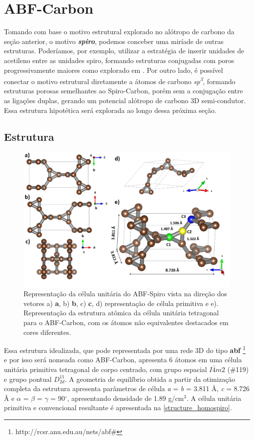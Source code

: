 \section{ABF-Carbon}
		
		Tomando com base o motivo estrutural explorado no alótropo de carbono da seção anterior, o motivo \textbf{\textit{spiro}}, podemos conceber uma miríade de outras estruturas. Poderíamos, por exemplo, utilizar a estratégia de inserir unidades de acetileno entre as unidades spiro, formando estruturas conjugadas com poros progressivamente maiores como explorado em \cite{costa2018n}. Por outro lado, é possível conectar o motivo estrutural diretamente a átomos de carbono \textit{sp\textsuperscript{3}}, formando estruturas porosas semelhantes ao Spiro-Carbon, porém sem a conjugação entre as ligações duplas, gerando um potencial alótropo de carbono 3D semi-condutor. Essa estrutura hipotética será explorada ao longo dessa próxima seção.
	
	\subsection{Estrutura}
	
				
		\begin{figure}[ht!]
			\centering
			\includegraphics[width=.9\linewidth]{capitulos/fig/results2/structure}
			\caption{Representação da célula unitária do ABF-Spiro vista na direção dos vetores a) \textbf{a}, b) \textbf{b}, c) \textbf{c}, d) representação de célula primitiva e e). Representação da estrutura atômica da célula unitária tetragonal para o ABF-Carbon, com os átomos não equivalentes destacados em cores diferentes.}
			\label{structure_homospiro}
		\end{figure}	
	
		Essa estrutura idealizada, que pode representada por uma rede 3D do tipo \textbf{abf} \footnote{http://rcsr.anu.edu.au/nets/abf\#} e por isso será nomeada como ABF-Carbon, apresenta 6 átomos em uma célula unitária primitiva tetragonal de corpo centrado, com grupo espacial $I\bar{4}m2$ (\#119) e grupo pontual $D_{2d}^{11}$. A geometria de equilíbrio obtida a partir da otimização completa da estrutura apresenta parâmetros de célula \textit{a} = \textit{b} = 3.811 \AA{}, \textit{c} = 8.726 \AA{} e $\alpha$ = $\beta$ = $\gamma$ = 90$^\circ$, apresentando densidade de 1.89 g/cm$^3$. A célula unitária primitiva e convencional resultante é apresentada na \autoref{structure_homospiro}.

